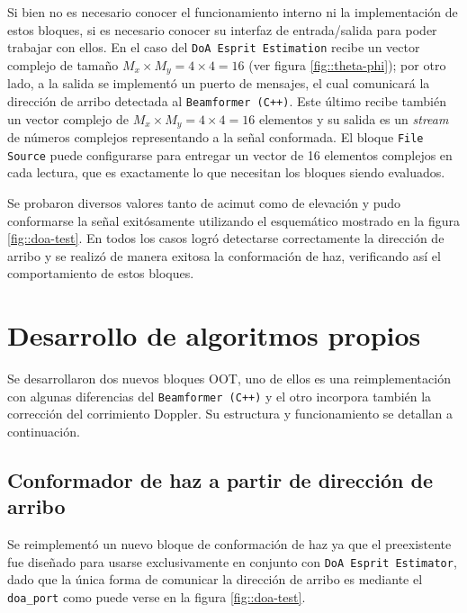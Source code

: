 \documentclass[../../main.tex]{subfiles}
\begin{document}
Si bien no es necesario conocer el funcionamiento interno ni la implementación de estos bloques, si es necesario conocer su interfaz de entrada/salida para poder trabajar con ellos. En el caso del \texttt{DoA Esprit Estimation} recibe un vector complejo de tamaño $M_x \times M_y = 4 \times 4 = 16$ (ver figura \ref{fig::theta-phi}); por otro lado, a la salida se implementó un puerto de mensajes, el cual comunicará la dirección de arribo detectada al \texttt{Beamformer (C++)}. Este último recibe también un vector complejo de $M_x \times M_y = 4 \times 4 = 16$ elementos y su salida es un \textit{stream} de números complejos representando a la señal conformada. El bloque \texttt{File Source} puede configurarse para entregar un vector de 16 elementos complejos en cada lectura, que es exactamente lo que necesitan los bloques siendo evaluados.

Se probaron diversos valores tanto de acimut como de elevación y pudo conformarse la señal exitósamente utilizando el esquemático mostrado en la figura \ref{fig::doa-test}. En todos los casos logró detectarse correctamente la dirección de arribo y se realizó de manera exitosa la conformación de haz, verificando así el comportamiento de estos bloques.



\section{Desarrollo de algoritmos propios}
Se desarrollaron dos nuevos bloques OOT, uno de ellos es una reimplementación con algunas diferencias del \texttt{Beamformer (C++)} y el otro incorpora también la corrección del corrimiento Doppler. Su estructura y funcionamiento se detallan a continuación.

\subsection{Conformador de haz a partir de dirección de arribo}
Se reimplementó un nuevo bloque de conformación de haz ya que el preexistente fue diseñado para usarse exclusivamente en conjunto con \texttt{DoA Esprit Estimator}, dado que la única forma de comunicar la dirección de arribo es mediante el \texttt{doa\_port} como puede verse en la figura \ref{fig::doa-test}. 
\end{document}
